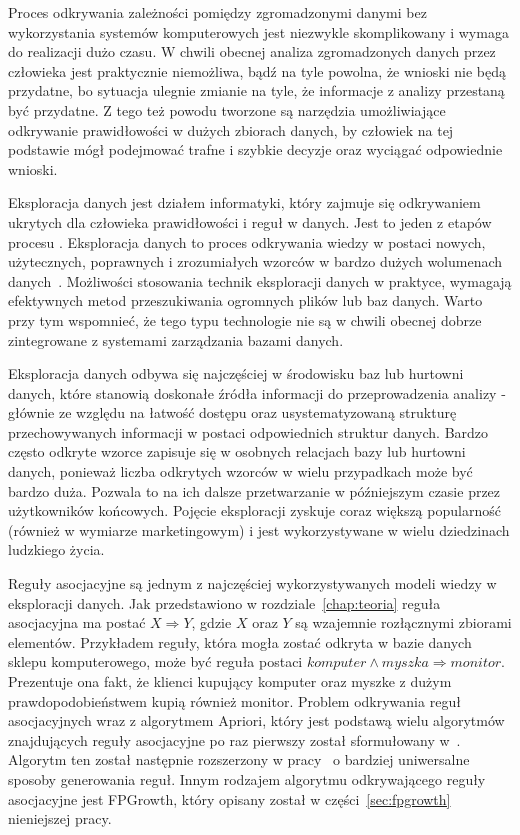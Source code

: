 Proces odkrywania zależności pomiędzy zgromadzonymi danymi bez wykorzystania systemów komputerowych jest niezwykle skomplikowany i wymaga do realizacji dużo czasu. W chwili obecnej analiza zgromadzonych danych przez człowieka jest praktycznie niemożliwa, bądź na tyle powolna, że wnioski nie będą przydatne, bo sytuacja ulegnie zmianie na tyle, że informacje z analizy przestaną być przydatne. Z tego też powodu tworzone są narzędzia umożliwiające odkrywanie prawidłowości w dużych zbiorach danych, by człowiek na tej podstawie mógł podejmować trafne i szybkie decyzje oraz wyciągać odpowiednie wnioski.

Eksploracja danych jest działem informatyki, który zajmuje się odkrywaniem ukrytych dla człowieka prawidłowości i reguł w danych. Jest to jeden z etapów procesu . Eksploracja danych to proces odkrywania wiedzy w postaci nowych, użytecznych, poprawnych i zrozumiałych wzorców w bardzo dużych wolumenach danych~\cite{DataMiningStart}. Możliwości stosowania technik eksploracji danych w praktyce, wymagają efektywnych metod przeszukiwania ogromnych plików lub baz danych. Warto przy tym wspomnieć, że tego typu technologie nie są w chwili obecnej dobrze zintegrowane z systemami zarządzania bazami danych.

Eksploracja danych odbywa się najczęściej w środowisku baz lub hurtowni danych, które stanowią doskonałe źródła informacji do przeprowadzenia analizy - głównie ze względu na łatwość dostępu oraz usystematyzowaną strukturę przechowywanych informacji w postaci odpowiednich struktur danych. Bardzo często odkryte wzorce zapisuje się w osobnych relacjach bazy lub hurtowni danych, ponieważ liczba odkrytych wzorców w wielu przypadkach może być bardzo duża. Pozwala to na ich dalsze przetwarzanie w późniejszym czasie przez użytkowników końcowych. Pojęcie eksploracji zyskuje coraz większą popularność (również w wymiarze marketingowym) i jest wykorzystywane w wielu dziedzinach ludzkiego życia.

Reguły asocjacyjne są jednym z najczęściej wykorzystywanych modeli wiedzy w eksploracji danych. Jak przedstawiono w rozdziale~\ref{chap:teoria} reguła asocjacyjna ma postać $X \Rightarrow Y$, gdzie $X$ oraz $Y$ są wzajemnie rozłącznymi zbiorami elementów. Przykładem reguły, która mogła zostać odkryta w bazie danych sklepu komputerowego, może być reguła postaci $komputer \land myszka \Rightarrow monitor$. Prezentuje ona fakt, że klienci kupujący komputer oraz myszke z dużym prawdopodobieństwem kupią również monitor. Problem odkrywania reguł asocjacyjnych wraz z algorytmem Apriori, który jest podstawą wielu algorytmów znajdujących reguły asocjacyjne po raz pierwszy został sformułowany w~\cite{Problem:Statement}. Algorytm ten został następnie rozszerzony w pracy~\cite{AssRulesStrt} o bardziej uniwersalne sposoby generowania reguł. Innym rodzajem algorytmu odkrywającego reguły asocjacyjne jest FPGrowth, który opisany został w części~\ref{sec:fpgrowth} nieniejszej pracy.

